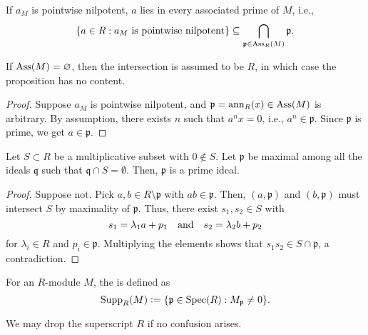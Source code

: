 \begin{prop} \label{prop:pointwise-nilpotent-every-associated-prime}
	If $a_{M}$ is pointwise nilpotent, $a$ lies in every associated prime of $M$, i.e.,
	\begin{equation*} 
		\{a \in R : a_{M} \text{ is pointwise nilpotent}\} \subseteq \bigcap_{\mathfrak{p} \in \operatorname{Ass}_{R}(M)} \mathfrak{p}.
	\end{equation*}
\end{prop}
If $\operatorname{Ass}(M) = \varnothing$, then the intersection is assumed to be $R$, in which case the proposition has no content.
\begin{proof} 
	Suppose $a_{M}$ is pointwise nilpotent, and $\mathfrak{p} = \operatorname{ann}_{R}(x) \in \operatorname{Ass}(M)$ is arbitrary. By assumption, there exists $n$ such that $a^{n} x = 0$, i.e., $a^{n} \in \mathfrak{p}$. Since $\mathfrak{p}$ is prime, we get $a \in \mathfrak{p}$.
\end{proof}

\begin{prop}
	Let $S \subset R$ be a multiplicative subset with $0 \notin S$. Let $\mathfrak{p}$ be maximal among all the ideals $\mathfrak{q}$ such that $\mathfrak{q} \cap S = \emptyset$. Then, $\mathfrak{p}$ is a prime ideal.
\end{prop}
\begin{proof} 
	Suppose not. Pick $a, b \in R \setminus \mathfrak{p}$ with $ab \in \mathfrak{p}$. Then, $(a, \mathfrak{p})$ and $(b, \mathfrak{p})$ must intersect $S$ by maximality of $\mathfrak{p}$. Thus, there exist $s_{1}, s_{2} \in S$ with
	\begin{equation*} 
		s_{1} = \lambda_{1} a + p_{1} \quad\text{and}\quad s_{2} = \lambda_{2} b + p_{2}
	\end{equation*}
	for $\lambda_{i} \in R$ and $p_{i} \in \mathfrak{p}$. Multiplying the elements shows that $s_{1} s_{2} \in S \cap \mathfrak{p}$, a contradiction.
\end{proof}

\begin{defn}
	For an $R$-module $M$, the  is defined as
	\begin{equation*} 
		\operatorname{Supp}_{R}(M) \vcentcolon= \{\mathfrak{p} \in \operatorname{Spec}(R) : M_{\mathfrak{p}} \neq 0\}.
	\end{equation*}
\end{defn}

We may drop the superscript $R$ if no confusion arises.

